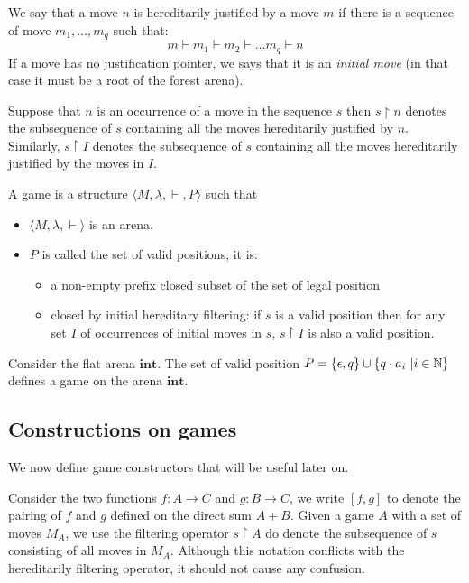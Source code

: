 We say that a move $n$ is hereditarily justified by a move $m$ if there is a sequence of move
$m_1, \ldots, m_q$ such that:
$$ m \vdash m_1 \vdash m_2 \vdash \ldots m_q \vdash n$$
If a move has no justification pointer, we says that it is an
\emph{initial move} (in that case it must be a root of the forest
arena).

Suppose that $n$ is an occurrence of a move in the sequence $s$ then
$s \upharpoonright n$ denotes the subsequence of $s$ containing all the moves hereditarily justified by $n$.
Similarly, $s \upharpoonright I$ denotes the
subsequence of $s$ containing all the moves hereditarily justified by the moves in $I$.

\begin{dfn}[Game]
A game is a structure $\langle M, \lambda, \vdash, P \rangle$ such that
\begin{itemize}
\item $ \langle M, \lambda, \vdash \rangle$ is an arena.
\item $P$ is called the set of valid positions, it is:
    \begin{itemize}
    \item a non-empty prefix closed subset of the set of legal position
    \item closed by initial hereditary filtering: if $s$ is a valid position then for any set $I$ of occurrences of initial moves
    in $s$, $s\upharpoonright I$ is also a valid position.
    \end{itemize}
\end{itemize}
\end{dfn}

\begin{exmp}  Consider the flat arena  $\mathbf{int}$.
The set of valid position $P = \{ \epsilon, q \} \cup \{ q \cdot
a_i \ | i \in \mathbb{N} \}$ defines a game on the arena $\mathbf{int}$.
\end{exmp}

\subsection{Constructions on games}
\label{sec:gameconstruction}

We now define game constructors that will be useful later on.

Consider the two functions $f : A \rightarrow C$ and $g : B
\rightarrow C$, we write $[f,g]$ to denote the pairing of $f$ and
$g$ defined on the direct sum $A + B$. Given a game $A$ with a set
of moves $M_A$, we use the filtering operator $s \upharpoonright A$
do denote the subsequence of $s$ consisting of all moves in $M_A$.
Although this notation conflicts with the hereditarily filtering
operator, it should not cause any confusion.

